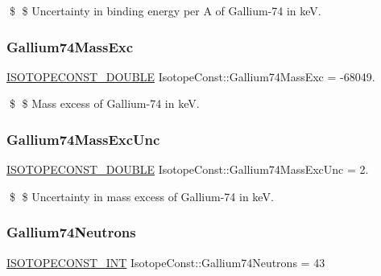 \$ \$ Uncertainty in binding energy per A of Gallium-\/74 in keV. \mbox{\label{group___isotope_const-_gallium-_ga74_ga122f894e78dc1d59b74c7e297f9aa6c6}} 
\subsubsection{\texorpdfstring{Gallium74\+Mass\+Exc}{Gallium74MassExc}}
{\footnotesize\ttfamily \mbox{\hyperlink{group___isotope_const-_macros_ga8f45a7272ce02c0b4c65c44636ed719a}{I\+S\+O\+T\+O\+P\+E\+C\+O\+N\+S\+T\+\_\+\+D\+O\+U\+B\+LE}} Isotope\+Const\+::\+Gallium74\+Mass\+Exc = -\/68049.}

\$ \$ Mass excess of Gallium-\/74 in keV. \mbox{\label{group___isotope_const-_gallium-_ga74_ga1e6de6b64efa98208f0dce5136bff1e8}} 
\subsubsection{\texorpdfstring{Gallium74\+Mass\+Exc\+Unc}{Gallium74MassExcUnc}}
{\footnotesize\ttfamily \mbox{\hyperlink{group___isotope_const-_macros_ga8f45a7272ce02c0b4c65c44636ed719a}{I\+S\+O\+T\+O\+P\+E\+C\+O\+N\+S\+T\+\_\+\+D\+O\+U\+B\+LE}} Isotope\+Const\+::\+Gallium74\+Mass\+Exc\+Unc = 2.}

\$ \$ Uncertainty in mass excess of Gallium-\/74 in keV. \mbox{\label{group___isotope_const-_gallium-_ga74_ga3b70a997751fb862c739a21072a210a9}} 
\subsubsection{\texorpdfstring{Gallium74\+Neutrons}{Gallium74Neutrons}}
{\footnotesize\ttfamily \mbox{\hyperlink{group___isotope_const-_macros_ga5f18360b3e99483a35c32d789e62621c}{I\+S\+O\+T\+O\+P\+E\+C\+O\+N\+S\+T\+\_\+\+I\+NT}} Isotope\+Const\+::\+Gallium74\+Neutrons = 43}

